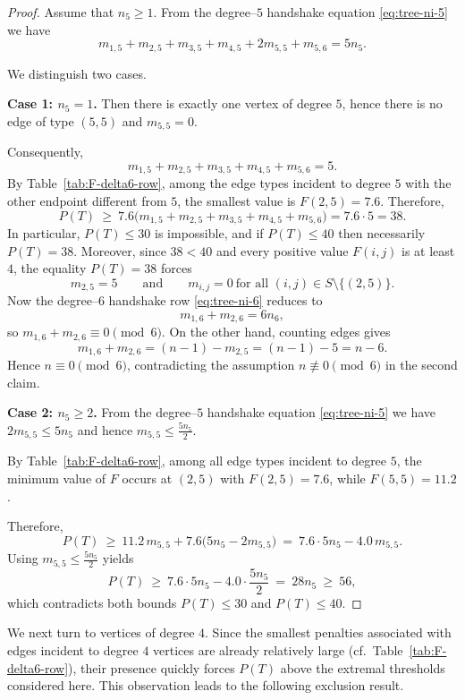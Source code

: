 \documentclass[preprint,12pt]{elsarticle}
\begin{document}
\begin{proof}
Assume that $n_5\ge 1$.
From the degree--$5$ handshake equation \eqref{eq:tree-ni-5} we have
\[
m_{1,5}+m_{2,5}+m_{3,5}+m_{4,5}+2m_{5,5}+m_{5,6}=5n_5.
\]

We distinguish two cases.

\medskip
\noindent\textbf{Case 1: $n_5=1$.}
Then there is exactly one vertex of degree $5$, hence there is no edge of type $(5,5)$ and $m_{5,5}=0$.

Consequently,
\[
m_{1,5}+m_{2,5}+m_{3,5}+m_{4,5}+m_{5,6}=5.
\]
By Table~\ref{tab:F-delta6-row}, among the edge types incident to degree $5$ with the other endpoint
different from $5$, the smallest value is $F(2,5)=7.6$. Therefore,
\[
P(T)\ \ge\ 7.6\bigl(m_{1,5}+m_{2,5}+m_{3,5}+m_{4,5}+m_{5,6}\bigr)=7.6\cdot 5=38.
\]
In particular, $P(T)\le 30$ is impossible, and if $P(T)\le 40$ then necessarily $P(T)=38$.
Moreover, since $38<40$ and every positive value $F(i,j)$ is at least $4$,
the equality $P(T)=38$ forces
\[
m_{2,5}=5
\qquad\text{and}\qquad
m_{i,j}=0\ \text{for all }(i,j)\in S\setminus\{(2,5)\}.
\]
Now the degree--$6$ handshake row \eqref{eq:tree-ni-6} reduces to
\[
m_{1,6}+m_{2,6}=6n_6,
\]
so $m_{1,6}+m_{2,6}\equiv 0\pmod 6$.
On the other hand, counting edges gives
\[
m_{1,6}+m_{2,6}= (n-1)-m_{2,5} = (n-1)-5 = n-6.
\]
Hence $n\equiv 0\pmod 6$, contradicting the assumption $n\not\equiv 0\pmod 6$ in the second claim.

\medskip
\noindent\textbf{Case 2: $n_5\ge 2$.}
From the degree--$5$ handshake equation \eqref{eq:tree-ni-5} we have $2m_{5,5}\le 5n_5$ and hence $m_{5,5}\le \frac{5n_5}{2}$.


By Table~\ref{tab:F-delta6-row}, among all edge types incident to degree $5$, the minimum value of $F$  occurs at $(2,5)$ with $F(2,5)=7.6$, while $F(5,5)=11.2$.

Therefore,
\[
P(T)
\ \ge\ 
11.2\,m_{5,5}
+7.6\bigl(5n_5-2m_{5,5}\bigr)
\ =\ 
7.6\cdot 5n_5 -4.0\,m_{5,5}.
\]
Using $m_{5,5}\le \frac{5n_5}{2}$ yields
\[
P(T)
\ \ge\ 
7.6\cdot 5n_5
-4.0\cdot \frac{5n_5}{2}
\ =\ 
28n_5
\ \ge\ 
56,
\]
which contradicts both bounds $P(T)\le 30$ and $P(T)\le 40$.

\end{proof}


We next turn to vertices of degree $4$. Since the smallest penalties associated with
edges incident to degree $4$ vertices are already relatively large
(cf.\ Table~\ref{tab:F-delta6-row}), their presence quickly forces $P(T)$ above the
extremal thresholds considered here. This observation leads to the following
exclusion result.
\end{document}
